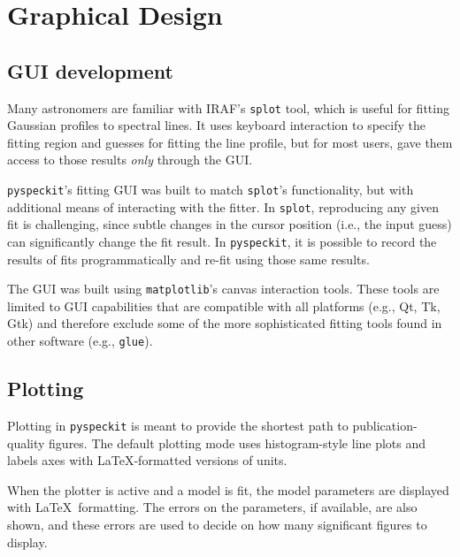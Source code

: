 \documentclass[twocolumn]{aastex62}
\newcommand{\pyspeckit}{\texttt{pyspeckit}\xspace}
\newcommand{\astropy}{\texttt{astropy}\xspace}
\begin{document}
\section{Graphical Design}
\label{sec:gui}
\subsection{GUI development}
Many astronomers are familiar with IRAF's \texttt{splot} tool, which is useful
for fitting Gaussian profiles to spectral lines.  It uses keyboard interaction
to specify the fitting region and guesses for fitting the line profile, but for
most users, gave them access to those results \emph{only} through the GUI.

\texttt{pyspeckit}'s fitting GUI was built to match \texttt{splot}'s
functionality, but with additional means of interacting with the fitter.  In
\texttt{splot}, reproducing any given fit is challenging, since subtle changes
in the cursor position (i.e., the input guess) can significantly change the fit
result.  In \pyspeckit, it is possible to record the results of fits
programmatically and re-fit using those same results.

The GUI was built using \texttt{matplotlib}'s canvas interaction tools.  These
tools are limited to GUI capabilities that are compatible with all platforms
(e.g., Qt, Tk, Gtk) and therefore exclude some of the more sophisticated fitting
tools found in other software (e.g., \texttt{glue}).

\subsection{Plotting}
Plotting in \pyspeckit is meant to provide the shortest path to
publication-quality figures.  The default plotting mode uses histogram-style
line plots and labels axes with \LaTeX-formatted versions of units.

When the plotter is active and a model is fit, the model parameters are
displayed with \LaTeX~formatting.  The errors on the parameters, if available,
are also shown, and these errors are used to decide on how many significant
figures to display.

\end{document}
